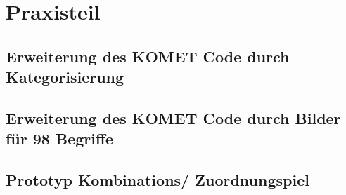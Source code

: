 \documentclass[a4paper, 12pt, twoside, BCOR=20mm, DIV=calc, abstracton, parskip=half*, toc=bibliography, toc=listof, headsepline, footsepline, headings=small, numbers=enddot]{scrreprt}
\begin{document}
	
	\chapter{Praxisteil}
	\section{Erweiterung des KOMET Code durch Kategorisierung}
	\section{Erweiterung des KOMET Code durch Bilder für 98 Begriffe}
	\section{Prototyp Kombinations/ Zuordnungspiel}
	
	\printbibliography
%	
\end{document}
